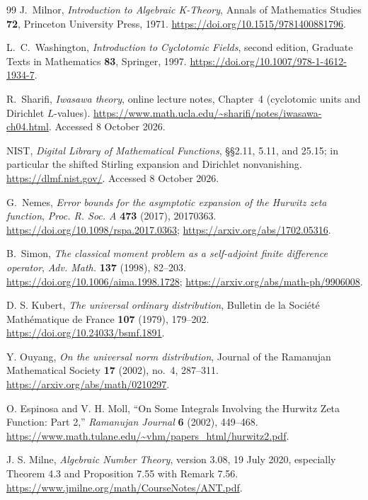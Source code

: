 \begin{thebibliography}{99}
J.~Milnor,
\emph{Introduction to Algebraic K-Theory},
Annals of Mathematics Studies \textbf{72},
Princeton University Press, 1971.
\url{https://doi.org/10.1515/9781400881796}.

L.~C.~Washington,
\emph{Introduction to Cyclotomic Fields}, second edition,
Graduate Texts in Mathematics \textbf{83}, Springer, 1997.
\url{https://doi.org/10.1007/978-1-4612-1934-7}.

R.~Sharifi,
\emph{Iwasawa theory}, online lecture notes, Chapter~4
(cyclotomic units and Dirichlet $L$-values).
\url{https://www.math.ucla.edu/~sharifi/notes/iwasawa-ch04.html}.
Accessed 8 October 2026.

NIST,
\emph{Digital Library of Mathematical Functions},
\S\S2.11, 5.11, and 25.15; in particular the shifted Stirling
expansion and Dirichlet nonvanishing.
\url{https://dlmf.nist.gov/}.
Accessed 8 October 2026.

G.~Nemes,
\emph{Error bounds for the asymptotic expansion of the Hurwitz
zeta function},
\emph{Proc. R. Soc. A} \textbf{473} (2017), 20170363.
\url{https://doi.org/10.1098/rspa.2017.0363};
\url{https://arxiv.org/abs/1702.05316}.

B.~Simon,
\emph{The classical moment problem as a self-adjoint finite
difference operator},
\emph{Adv. Math.} \textbf{137} (1998), 82--203.
\url{https://doi.org/10.1006/aima.1998.1728};
\url{https://arxiv.org/abs/math-ph/9906008}.

D. S. Kubert, \emph{The universal ordinary distribution},
Bulletin de la Soci\'et\'e Math\'ematique de France
\textbf{107} (1979), 179--202.
\url{https://doi.org/10.24033/bsmf.1891}.

Y. Ouyang, \emph{On the universal norm distribution},
Journal of the Ramanujan Mathematical Society
\textbf{17} (2002), no.~4, 287--311.
\url{https://arxiv.org/abs/math/0210297}.

O. Espinosa and V. H. Moll, “On Some Integrals Involving the
Hurwitz Zeta Function: Part 2,” \emph{Ramanujan Journal}
\textbf{6} (2002), 449--468.
\url{https://www.math.tulane.edu/~vhm/papers_html/hurwitz2.pdf}.

J. S. Milne, \emph{Algebraic Number Theory}, version 3.08,
19 July 2020, especially Theorem 4.3 and
Proposition 7.55 with Remark 7.56.
\url{https://www.jmilne.org/math/CourseNotes/ANT.pdf}.


\end{thebibliography}

